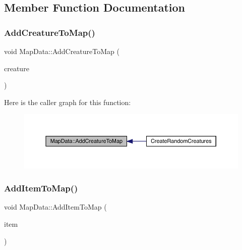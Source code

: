 \subsection{Member Function Documentation}
\mbox{\label{class_map_data_ab54fe2f14d5192d3e1683a6c48839f80}} 
\subsubsection{\texorpdfstring{Add\+Creature\+To\+Map()}{AddCreatureToMap()}}
{\footnotesize\ttfamily void Map\+Data\+::\+Add\+Creature\+To\+Map (\begin{DoxyParamCaption}\item[{\mbox{\hyperlink{class_base_creature}{Base\+Creature}}}]{creature }\end{DoxyParamCaption})}

Here is the caller graph for this function\+:
\nopagebreak
\begin{figure}[H]
\begin{center}
\leavevmode
\includegraphics[width=350pt]{de/d83/class_map_data_ab54fe2f14d5192d3e1683a6c48839f80_icgraph}
\end{center}
\end{figure}
\mbox{\label{class_map_data_a134c2de11f90b487d30fdae6570bc256}} 
\subsubsection{\texorpdfstring{Add\+Item\+To\+Map()}{AddItemToMap()}\hspace{0.1cm}{\footnotesize\ttfamily [1/2]}}
{\footnotesize\ttfamily void Map\+Data\+::\+Add\+Item\+To\+Map (\begin{DoxyParamCaption}\item[{\mbox{\hyperlink{class_item}{Item}} $\ast$}]{item }\end{DoxyParamCaption})}


